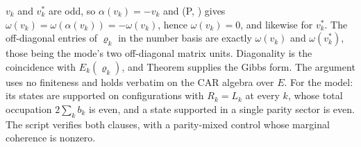 $v_k$ and $v_k^{*}$ are odd, so $\alpha(v_k) = -v_k$ and (P, ) gives $\omega(v_k) = \omega(\alpha(v_k)) = -\omega(v_k)$, hence $\omega(v_k) = 0$, and likewise for $v_k^{*}$. The off-diagonal entries of $\varrho_k$ in the number basis are exactly $\omega(v_k)$ and $\omega(v_k^{*})$, those being the mode's two off-diagonal matrix units. Diagonality is the coincidence with $E_k(\varrho_k)$, and Theorem  supplies the Gibbs form. The argument uses no finiteness and holds verbatim on the CAR algebra over $E$. For the model: its states are supported on configurations with $R_k = L_k$ at every $k$, whose total occupation $2\sum_k b_k$ is even, and a state supported in a single parity sector is even. The script verifies both clauses, with a parity-mixed control whose marginal coherence is nonzero.
